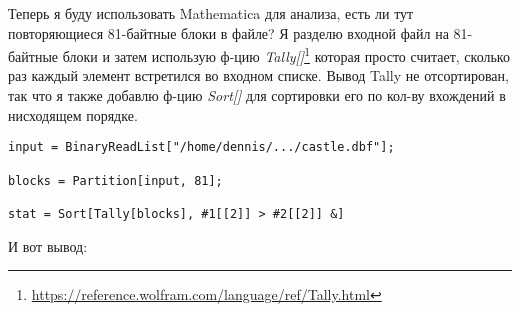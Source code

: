 Теперь я буду использовать Mathematica для анализа, есть ли тут повторяющиеся 81-байтные блоки в файле?
Я разделю входной файл на 81-байтные блоки и затем использую ф-цию
\emph{Tally[]}\footnote{\url{https://reference.wolfram.com/language/ref/Tally.html}}
которая просто считает, сколько раз каждый элемент встретился во входном списке.
Вывод Tally не отсортирован, так что я также добавлю ф-цию \emph{Sort[]} для сортировки его по кол-ву вхождений
в нисходящем порядке.

\begin{lstlisting}[style=custommath]
input = BinaryReadList["/home/dennis/.../castle.dbf"];

blocks = Partition[input, 81];

stat = Sort[Tally[blocks], #1[[2]] > #2[[2]] &]
\end{lstlisting}

И вот вывод:

